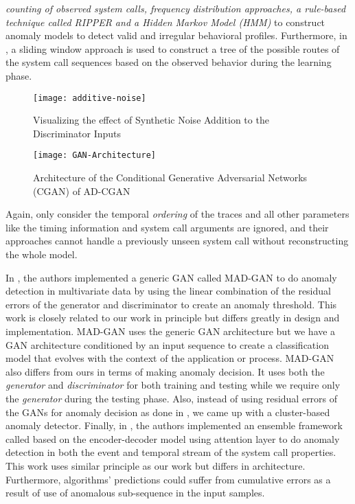 \emph{counting of observed system calls, frequency distribution approaches, a 
	rule-based technique called RIPPER and a Hidden Markov Model (HMM)} to 
construct anomaly models to detect valid and irregular behavioral profiles. 
Furthermore, in \cite{hofmeyr1998intrusion}, a sliding window approach is used to 
construct a tree of the possible routes of the system call sequences based on 
the observed behavior during the learning phase.
\begin{figure}[h!]
	\centering
	\texttt{[image: additive-noise]}%
	\caption{Visualizing the effect of Synthetic Noise Addition to the Discriminator Inputs}
	\label{fig:synthetic-noise}%
\end{figure}
\begin{figure*}[h!]
	\centering
	\texttt{[image: GAN-Architecture]}%
	\caption{Architecture of the Conditional Generative Adversarial Networks (CGAN) of AD-CGAN}%
	\label{fig:cgan}%
\end{figure*}
 Again, \cite{warrender1999detecting,hofmeyr1998intrusion} only consider the temporal 
\emph{ordering} of the traces and all other parameters like the timing 
information and system call arguments are ignored, and their approaches cannot 
handle a previously unseen system call without reconstructing the whole model.
\par
In \cite{li2019mad}, the authors implemented a generic GAN called MAD-GAN to do anomaly detection in multivariate data by using the linear combination of the residual errors of the generator and discriminator to create an anomaly threshold. This work is closely related to our work in principle but differs greatly in design and implementation. MAD-GAN uses the generic GAN architecture but we have a GAN architecture conditioned by an input sequence to create a classification model that evolves with the context of the application or process. MAD-GAN also differs from ours in terms of making anomaly decision. It uses both the \textit{generator} and \textit{discriminator} for both training and testing while we require only the \textit{generator} during the testing phase. Also, instead of using residual errors of the GANs for anomaly decision as done in \cite{li2019mad}, we came up with a cluster-based anomaly detector. Finally, in \cite{ezeme2019deepanom,ezeme2020framework}, the authors implemented an ensemble framework called based on the encoder-decoder model using attention layer to do anomaly detection in both the event and temporal stream of the system call properties. This work uses similar principle as our work but differs in architecture. Furthermore, \cite{ezeme2019deepanom,ezeme2020framework} algorithms' predictions could suffer from cumulative errors as a result of use of anomalous sub-sequence in the input samples.

